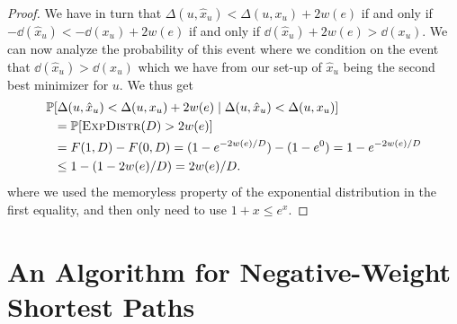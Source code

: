 \begin{proof}
We have in turn that $\Delta(u, \hat{x}_u) < \Delta(u, x_u) + 2 w(e)$ if and only if $- \dd(\hat{x}_u) < - \dd(x_u) +  2w(e)$ if and only if $\dd(\hat{x}_u) + 2w(e) > \dd(x_u)$.   We can now analyze the probability of this event where we condition on the event that $\dd(\hat{x}_u) > \dd(x_u)$ which we have from our set-up of $\hat{x}_u$ being the second best minimizer for $u$. We thus get  
\begin{align*}
	\mathbb{P}&[\Delta(u, \hat{x}_u) < \Delta(u, x_u) + 2 w(e) \;|\; \Delta(u, \hat{x}_u) < \Delta(u, x_u)] \\
	&= \mathbb{P}[ \textsc{ExpDistr}(D) > 2w(e)] \\
	&= F(1, D) - F(0, D) = (1 - e^{-2w(e)/D}) - (1 - e^{0}) = 1 - e^{-2w(e)/D} \\ &\leq 1 - (1 - 2w(e)/D) = 2w(e)/D.
\end{align*}
where we used the memoryless property of the exponential distribution in the first equality, and then only need to use $1 + x \leq e^x$. 
\end{proof}

\section{An Algorithm for Negative-Weight Shortest Paths}
